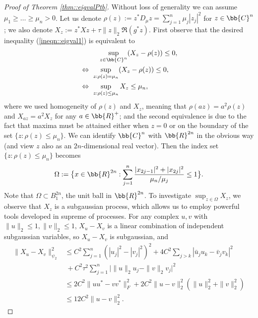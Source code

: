 \documentclass[12pt]{article}%
\theoremstyle{plain}%
\theoremstyle{remark}
\begin{document}
\begin{proof}[Proof of Theorem \ref{thm::eigvalPtb}]

Without loss of generality we can assume $\mu_1 \ge \ldots \ge \mu_n > 0$. Let us denote $\rho(z) := z^* D_\mu z = \sum_{j=1}^n \mu_j |z_j|^2$ for $z \in \bb{C}^n$; we also denote $X_z := z^* X z + \tau \| z \|_2 \Re(g^* z)$. First observe that the desired inequality (\ref{ineqn::eigval1}) is equivalent to
\begin{align*}
& \qquad ~~ \sup_{z \in \bb{C}^n} (X_z - \rho(z)) \le 0, \\
&\Leftrightarrow ~ \sup_{z: \rho(z) = \mu_n} ( X_z - \rho(z) ) \le 0, \\
&\Leftrightarrow ~ \sup_{z: \rho(z) \le \mu_n}  X_z \le \mu_n,
\end{align*}
where we used homogeneity of $\rho(z)$ and $X_z$, meaning that $\rho(az) = a^2 \rho(z)$ and $X_{az} = a^2 X_z$ for any $a \in \bb{R}^+$; and the second equivalence is due to the fact that maxima must be attained  either when $z=0$ or on the boundary of the set $\{z:\rho(z) \le \mu_n\}$. We can identify $\bb{C}^n$ with $\bb{R}^{2n}$ in the obvious way (and view $z$ also as an $2n$-dimensional real vector). Then the index set $\{z:\rho(z) \le \mu_n\}$ becomes
\begin{equation*}
\Omega := \big\{ x \in \bb{R}^{2n}: \sum_{j=1}^n \frac{ |x_{2j-1}|^2 +  |x_{2j}|^2}{ \mu_n / \mu_j} \le 1 \big\}.
\end{equation*}
Note that $\Omega \subset B_1^{2n}$, the unit ball in $\bb{R}^{2n}$. To investigate $\sup_{z\in \Omega}  X_z$, we observe that $X_z$ is a subgaussian process, which allows us to employ powerful tools developed in supreme of processes. For any complex $u,v$ with $\| u \|_2 \le 1, \| v \|_2 \le 1$, $X_u - X_v$ is a linear combination of independent subgaussian variables, so $X_u - X_v$ is subgaussian, and 
\begin{align*}
\| X_u - X_v \|_{\psi_2}^2 &\le C^2 \sum_{j=1}^n ( | u_j |^2 - |v_j|^2 )^2 + 4C^2 \sum_{j > k} | \bar{u}_j u_k - \bar{v}_j v_k |^2 \\
&~+ C^2\tau^2 \sum_{j=1}^n \big| \| u \|_2 u_j - \| v \|_2 v_j \big|^2 \\
&\le 2C^2 \| uu^* - vv^* \|_F^2 +2C^2 \| u - v \|_2^2 ( \| u \|_2^2 + \|v \|_2^2)\\
&\le 12C^2 \| u - v\|_2^2.
\end{align*}



\end{proof}
\end{document}
